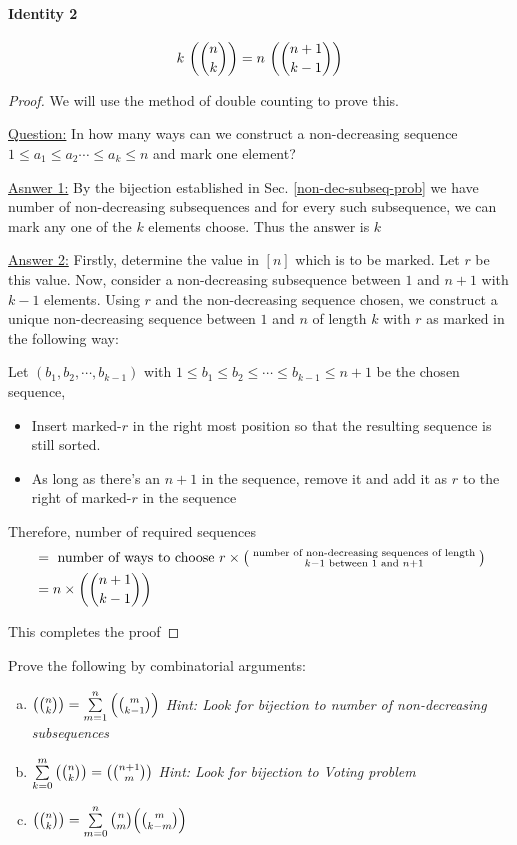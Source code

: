 \paragraph{Identity 2}
$$k~\textrm{$\left(\binom{n}{k}\right)$}=n~\textrm{$\left(\binom{n+1}{k-1}\right)$}$$
\begin{proof}
We will use the method of double counting to prove this.
\begin{description}
\item \underline{Question:} In how many ways can we construct a non-decreasing sequence $1\leq a_1\leq a_2\cdots\leq a_k\leq n$ and mark one element?
\item \underline{Asnwer 1:} By the bijection established in Sec. \ref{non-dec-subseq-prob} we have  number of non-decreasing subsequences and for every such subsequence, we can mark any one of the $k$ elements choose. Thus the answer is $k$  
\item \underline{Answer 2:} Firstly, determine the value in $[n]$ which is to be marked. Let $r$ be this value. Now, consider a non-decreasing subsequence between $1$ and $n+1$ with $k-1$ elements. Using $r$ and the non-decreasing sequence chosen, we construct a unique non-decreasing sequence between $1$ and $n$ of length $k$ with $r$ as marked in the following way:

Let $(b_1,b_2,\cdots,b_{k-1})$ with $1\leq b_1\leq b_2\leq\cdots\leq b_{k-1}\leq n+1$ be the chosen sequence, 
\begin{itemize}
    \item Insert marked-$r$ in the right most position so that the resulting sequence is still sorted.
    \item As long as there's an $n+1$ in the sequence, remove it and add it as $r$ to the right of marked-$r$ in the sequence
\end{itemize}
Therefore, number of required sequences 
\begin{align*}
    &= \textrm{ number of ways to choose }r \times \left( \substack{\textrm{ number of non-decreasing sequences of length }\\ k-1 \textrm{ between } 1 \textrm{ and } n+1} \right)\\
    &= n\times \textrm{$\left(\binom{n+1}{k-1}\right)$}
\end{align*}
\end{description}
This completes the proof
\end{proof}

\begin{exercise}
Prove the following by combinatorial arguments:
\begin{enumerate}[(a)]
    \item $\textrm{$\left(\binom{n}{k}\right)$}=\sum\limits_{m=1}^{n}\textrm{$\left(\binom{m}{k-1}\right)$}$ \emph{Hint: Look for bijection to number of non-decreasing subsequences}
    \item $\sum\limits_{k=0}^{m}\textrm{$\left(\binom{n}{k}\right)$}=\textrm{$\left(\binom{n+1}{m}\right)$}$ \emph{Hint: Look for bijection to Voting problem}
    \item $\textrm{$\left(\binom{n}{k}\right)$}=\sum\limits_{m=0}^{n}\binom{n}{m}\textrm{$\left(\binom{m}{k-m}\right)$}$
\end{enumerate}
\end{exercise}

